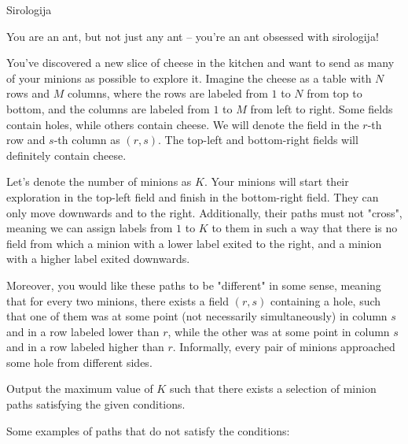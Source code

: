 \begin{statement}[
  problempoints=100,
  timelimit=1 second,
  memorylimit=1024 MiB,
]{Sirologija}

You are an ant, but not just any ant – you're an ant obsessed with sirologija!

You've discovered a new slice of cheese in the kitchen and want to send as many of your minions as possible to explore it. Imagine the cheese as a table with $N$ rows and $M$ columns, where the rows are labeled from $1$ to $N$ from top to bottom, and the columns are labeled from $1$ to $M$ from left to right. Some fields contain holes, while others contain cheese. We will denote the field in the $r$-th row and $s$-th column as $(r, s)$. The top-left and bottom-right fields will definitely contain cheese.

Let's denote the number of minions as $K$. Your minions will start their exploration in the top-left field and finish in the bottom-right field. They can only move downwards and to the right. Additionally, their paths must not "cross", meaning we can assign labels from $1$ to $K$ to them in such a way that there is no field from which a minion with a lower label exited to the right, and a minion with a higher label exited downwards.

Moreover, you would like these paths to be "different" in some sense, meaning that for every two minions, there exists a field $(r, s)$ containing a hole, such that one of them was at some point (not necessarily simultaneously) in column $s$ and in a row labeled lower than $r$, while the other was at some point in column $s$ and in a row labeled higher than $r$. Informally, every pair of minions approached some hole from different sides.

Output the maximum value of $K$ such that there exists a selection of minion paths satisfying the given conditions.

Some examples of paths that do not satisfy the conditions:


\end{statement}
